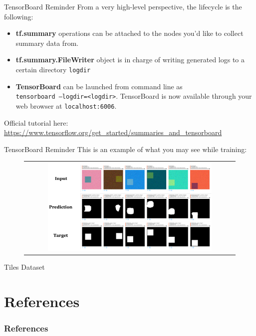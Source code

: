 \documentclass[aspectratio=169]{beamer}
\begin{document}

\begin{frame}{TensorBoard Reminder}
From a very high-level perspective, the lifecycle is the following:
\begin{itemize}
\item \textbf{tf.summary} operations can be attached to the nodes you'd like to collect summary data from.
\item \textbf{tf.summary.FileWriter} object is in charge of writing generated logs to a certain directory \texttt{logdir}
\item \textbf{TensorBoard} can be launched from command line as\\
\texttt{tensorboard --logdir=<logdir>}. TensorBoard is now available through your web browser at \texttt{localhost:6006}.
\end{itemize}
Official tutorial here: \url{https://www.tensorflow.org/get_started/summaries_and_tensorboard}
\end{frame}

\begin{frame}{TensorBoard Reminder}
This is an example of what you may see while training:
\begin{figure}
\centering
\begin{tabular}{c}
\includegraphics[width=0.8\textwidth]{img/tf/tensorboard_tiles.png}
\end{tabular}
\end{figure}
\end{frame}


\begin{frame}{Tiles Dataset}
\end{frame}



\section{References}

\begin{frame}[t, allowframebreaks]
\frametitle{References}


\end{frame}
\end{document}
